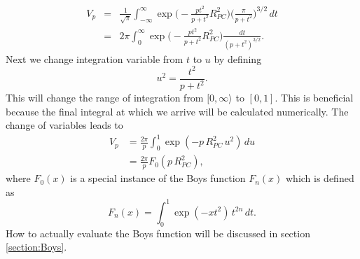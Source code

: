 \begin{eqnarray}
 V_p & = & \frac{1}{\sqrt{\pi}}\int_{-\infty}^\infty\exp\Big(-\frac{pt^2}{p + t^2}R^2_{PC}\Big)\Big(\frac{\pi}{p + t^2}\Big)^{3/2}\,dt \\
     & = & 2\pi\int_0^\infty\exp\Big(-\frac{pt^2}{p + t^2}R^2_{PC}\Big)\frac{dt}{(p + t^2)^{3/2}}.
\end{eqnarray}
Next we change integration variable from $t$ to $u$ by defining
\begin{equation}
 u^2 = \frac{t^2}{p + t^2}.
\end{equation}
This will change the range of integration from $[0,\infty\rangle$ to $[0,1]$. This is beneficial because the final integral at which we arrive will be calculated numerically.
The change of variables leads to
\begin{align}
\label{eq:V_p}
 V_p & = \frac{2\pi}{p}\int_0^1\exp(-p\,R^2_{PC}\,u^2)\,du \\
     & = \frac{2\pi}{p}F_0(p\,R^2_{PC}),
\end{align}
where $F_0(x)$ is a special instance of the Boys function $F_n(x)$ which is defined as
\begin{equation}
 F_n(x) = \int_0^1\exp(-xt^2)\,t^{2n}\,dt.
\end{equation}
How to actually evaluate the Boys function will be discussed in section \ref{section:Boys}.

